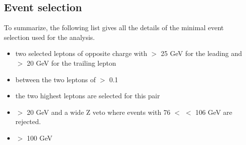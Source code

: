 \subsection{Event selection}
\label{subsec:selectionSummary}
To summarize, the following list gives all the details of the minimal event selection used for the analysis.
\begin{itemize}
    \item two selected leptons of opposite charge with \pt $>$ 25 GeV for the leading and \pt $>$ 20 GeV for the trailing lepton
    \item \dr between the two leptons of $>$ 0.1
    \item the two highest \pt leptons are selected for this pair
    \item \mll $>$ 20 GeV and a wide Z veto where events with 76 $<$  \mll $<$ 106 GeV are rejected. 
    \item \ptmiss $>$ 100 GeV
\end{itemize}                                                                                                                                  
